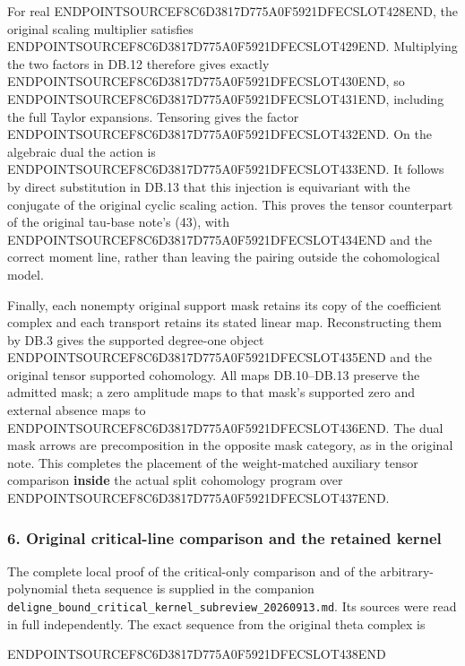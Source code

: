 For real ENDPOINTSOURCEF8C6D3817D775A0F5921DFECSLOT428END, the original scaling multiplier satisfies ENDPOINTSOURCEF8C6D3817D775A0F5921DFECSLOT429END. Multiplying the two factors in DB.12 therefore gives exactly ENDPOINTSOURCEF8C6D3817D775A0F5921DFECSLOT430END, so ENDPOINTSOURCEF8C6D3817D775A0F5921DFECSLOT431END, including the full Taylor expansions. Tensoring gives the factor ENDPOINTSOURCEF8C6D3817D775A0F5921DFECSLOT432END. On the algebraic dual the action is ENDPOINTSOURCEF8C6D3817D775A0F5921DFECSLOT433END. It follows by direct substitution in DB.13 that this injection is equivariant with the conjugate of the original cyclic scaling action. This proves the tensor counterpart of the original tau-base note's (43), with ENDPOINTSOURCEF8C6D3817D775A0F5921DFECSLOT434END and the correct moment line, rather than leaving the pairing outside the cohomological model.

Finally, each nonempty original support mask retains its copy of the coefficient complex and each transport retains its stated linear map. Reconstructing them by DB.3 gives the supported degree-one object ENDPOINTSOURCEF8C6D3817D775A0F5921DFECSLOT435END and the original tensor supported cohomology. All maps DB.10--DB.13 preserve the admitted mask; a zero amplitude maps to that mask's supported zero and external absence maps to ENDPOINTSOURCEF8C6D3817D775A0F5921DFECSLOT436END. The dual mask arrows are precomposition in the opposite mask category, as in the original note. This completes the placement of the weight-matched auxiliary tensor comparison \textbf{inside} the actual split cohomology program over ENDPOINTSOURCEF8C6D3817D775A0F5921DFECSLOT437END.

\subsubsection{6. Original critical-line comparison and the retained kernel}\label{endpoint-purity_review--original-critical-line-comparison-and-the-retained-kernel}

The complete local proof of the critical-only comparison and of the arbitrary-polynomial theta sequence is supplied in the companion \texttt{deligne\_bound\_critical\_kernel\_subreview\_20260913.md}. Its sources were read in full independently. The exact sequence from the original theta complex is

ENDPOINTSOURCEF8C6D3817D775A0F5921DFECSLOT438END

